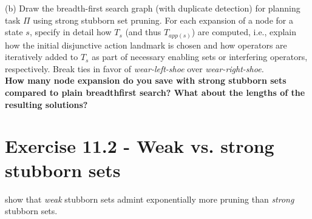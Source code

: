 \documentclass[11pt,a4paper]{article}
\begin{document}
(b) Draw the breadth-first search graph (with duplicate detection) for planning task $\Pi$ using
strong stubborn set pruning. For each expansion of a node for a state $s$, specify in detail how
$T_s$ (and thus $T_{app(s)}$) are computed, i.e., explain how the initial disjunctive action landmark
is chosen and how operators are iteratively added to $T_s$ as part of necessary enabling sets or
interfering operators, respectively. Break ties in favor of \emph{wear-left-shoe} over \emph{wear-right-shoe.}\\

\textbf{How many node expansion do you save with strong stubborn sets compared to plain breadthfirst search?
 What about the lengths of the resulting solutions?}\\

\begin{center}
\end{center}

\section*{Exercise 11.2 - Weak vs. strong stubborn sets}
show that \emph{weak} stubborn sets admint exponentially more pruning than
\emph{strong} stubborn sets.\\
\end{document}
